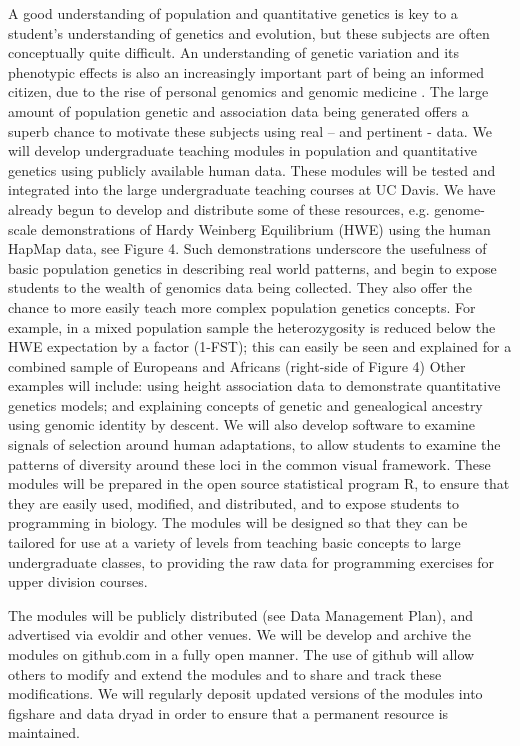 A good understanding of population and quantitative genetics is key to a student’s understanding of genetics and evolution, but these subjects are often conceptually quite difficult. An understanding of genetic variation and its phenotypic effects is also an increasingly important part of being an informed citizen, due to the rise of personal genomics and genomic medicine \citep[e.g.][]{redfield2012}. The large amount of population genetic and association data being generated offers a superb chance to motivate these subjects using real – and pertinent - data. 
We will develop undergraduate teaching modules in population and quantitative genetics using publicly available human data. These modules will be tested and integrated into the large undergraduate teaching courses at UC Davis. We have already begun to develop and distribute some of these resources, e.g. genome-scale demonstrations of Hardy Weinberg Equilibrium (HWE) using the human HapMap data, see Figure 4. Such demonstrations underscore the usefulness of basic population genetics in describing real world patterns, and begin to expose students to the wealth of genomics data being collected. They also offer the chance to more easily teach more complex population genetics concepts. For example, in a mixed population sample the heterozygosity is reduced below the HWE expectation by a factor (1-FST); this can easily be seen and explained for a combined sample of Europeans and Africans (right-side of Figure 4)
Other examples will include: using height association data to demonstrate quantitative genetics models; and explaining concepts of genetic and genealogical ancestry using genomic identity by descent. We will also develop software to examine signals of selection around human adaptations, to allow students to examine the patterns of diversity around these loci in the common visual framework. These modules will be prepared in the open source statistical program R, to ensure that they are easily used, modified, and distributed, and to expose students to programming in biology. The modules will be designed so that they can be tailored for use at a variety of levels from teaching basic concepts to large undergraduate classes, to providing the raw data for programming exercises for upper division courses.

The modules will be publicly distributed (see Data Management Plan), and advertised via evoldir and other venues. We will be develop and archive the modules on github.com in a fully open manner. The use of github will allow others to modify and extend the modules and to share and track these modifications. We will regularly deposit updated versions of the modules into figshare and data dryad in order to ensure that a permanent resource is maintained. 

